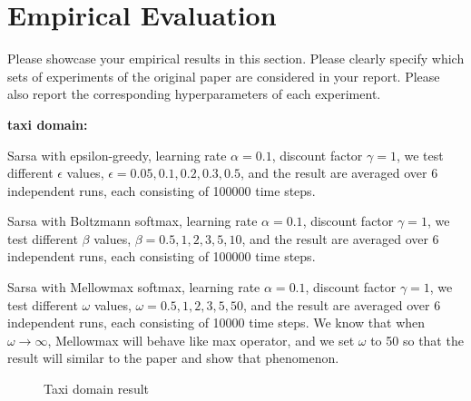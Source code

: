 \section{Empirical Evaluation}
\label{section:evaluation}
Please showcase your empirical results in this section. Please clearly specify which sets of experiments of the original paper are considered in your report. Please also report the corresponding hyperparameters of each experiment.

\textbf{taxi domain:}

Sarsa with epsilon-greedy, learning rate $\alpha = 0.1$, discount factor $\gamma = 1 $, we test different $\epsilon$ values, $\epsilon = 0.05, 0.1, 0.2, 0.3, 0.5$, and the result are averaged over 6 independent runs, each consisting of 100000 time steps.

Sarsa with Boltzmann softmax, learning rate $\alpha = 0.1$, discount factor $\gamma = 1 $, we test different $\beta$ values, $\beta = 0.5, 1, 2, 3, 5, 10$, and the result are averaged over 6 independent runs, each consisting of 100000 time steps.

Sarsa with Mellowmax softmax, learning rate $\alpha = 0.1$, discount factor $\gamma = 1 $, we test different $\omega$ values, $\omega = 0.5, 1, 2, 3, 5, 50$, and the result are averaged over 6 independent runs, each consisting of 10000 time steps. We know that when $\omega \to \infty$, Mellowmax will behave like max operator, and we set $\omega$ to 50 so that the result will similar to the paper and show that phenomenon.

\begin{figure}[H]
\centering  
{}
\caption{Taxi domain result}
\end{figure}